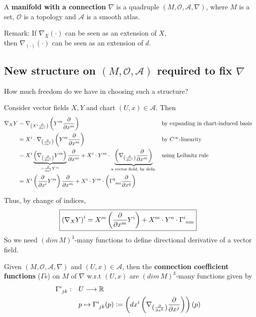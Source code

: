 A \textbf{manifold with a connection} $\nabla$ is a quadruple $(M, \mathcal{O}, \mathcal{A}, \nabla)$, where $M$ is a set, $\mathcal{O}$ is a topology and $\mathcal{A}$ is a smooth atlas.

Remark: If $\nabla_X (\cdot)$ can be seen as an extension of $X$, \\
then $\nabla_{(\cdot)}(\cdot)$ can be seen as an extension of $d$.

\subsection{New structure on $(M,\mathcal{O},\mathcal{A})$ required to fix $\nabla$}
How much freedom do we have in choosing such a structure?

Consider vector fields $X, Y$ and chart $(U,x) \in \mathcal{A}$. Then \\
\begin{align*}
\nabla_X Y & = \nabla_{\left(X^i \cibasis{x^i}\right)} \left(Y^m \cibasis{x^m}\right) && \text{by expanding in chart-induced basis} \\
& = X^i \cdot \nabla_{\left(\cibasis{x^i}\right)} \left(Y^m \cibasis{x^m}\right) && \text{by }C^\infty\text{-linearity} \\
& = X^i \underbrace{\left(\nabla_{\left(\cibasis{x^i}\right)} Y^m\right)}_{=\cibasis{x^i} Y^m} \cibasis{x^m} + X^i \cdot Y^m \cdot \underbrace{\left(\nabla_{\left(\cibasis{x^i}\right)} \cibasis{x^m}\right)}_{\text{a vector field, by defn.}} && \text{using Leibnitz rule} \\
& =  X^i \left(\cibasis{x^i} Y^m\right) \cibasis{x^m} + X^i \cdot Y^m \cdot \left(\ccf{q}{mi} \cibasis{x^q}\right)
\end{align*}

Thus, by change of indices, 
\begin{equation}
\boxed{\left(\nabla_X Y\right)^i = X^m \left(\cibasis{x^m} Y^i\right) + X^m \cdot Y^n \cdot \ccf{i}{nm}}
\end{equation}
So we need $(dim\,M)^3$-many functions to define directional derivative of a vector field.

\begin{definition}
Given $(M, \mathcal{O}, \mathcal{A}, \nabla)$ and $(U,x) \in \mathcal{A}$, then the \textbf{connection coefficient functions} ($\Gamma$s) on $M$ of $\nabla$ w.r.t $(U,x)$ are $(dim\,M)^3$-many functions given by
\begin{align}
\ccf{i}{jk} : \quad & U \to \mathbb{R} \nonumber \\ 
& p \mapsto \ccf{i}{jk}(p) := \left(dx^i \left(\nabla_{\left(\cibasis{x^k}\right)} \cibasis{x^j}\right)\right)(p)
\end{align}
\end{definition}

